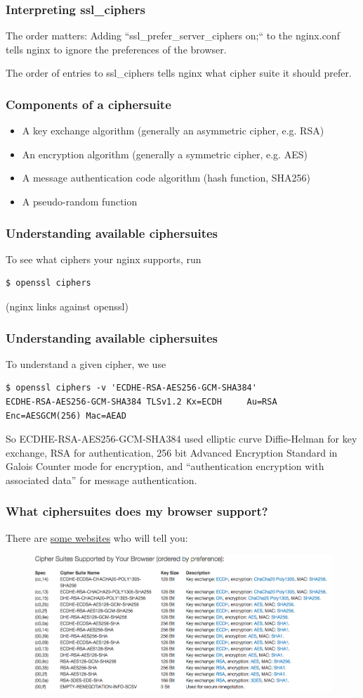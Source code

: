 \documentclass[9pt]{beamer}
\begin{document}
\begin{frame}
\frametitle{Interpreting ssl\_ciphers}
The order matters: Adding ``ssl\_prefer\_server\_ciphers on;`` to the nginx.conf tells nginx to ignore the preferences of the browser.

The order of entries to ssl\_ciphers tells nginx what cipher suite it should prefer.
\end{frame}

\begin{frame}[fragile]
\frametitle{Components of a ciphersuite}
\begin{itemize}
\item A key exchange algorithm (generally an asymmetric cipher, e.g. RSA)
\item An encryption algorithm (generally a symmetric cipher, e.g. AES)
\item A message authentication code algorithm  (hash function, SHA256)
\item A pseudo-random function
\end{itemize}
\end{frame}

\begin{frame}[fragile]
\frametitle{Understanding available ciphersuites}
To see what ciphers your nginx supports, run
\begin{verbatim}
$ openssl ciphers
\end{verbatim}
(nginx links against openssl)
\end{frame}

\begin{frame}[fragile]
\frametitle{Understanding available ciphersuites}
To understand a given cipher, we use
\begin{verbatim}
$ openssl ciphers -v 'ECDHE-RSA-AES256-GCM-SHA384'
ECDHE-RSA-AES256-GCM-SHA384 TLSv1.2 Kx=ECDH     Au=RSA  Enc=AESGCM(256) Mac=AEAD
\end{verbatim}
So ECDHE-RSA-AES256-GCM-SHA384 used elliptic curve Diffie-Helman for key exchange, RSA for authentication, 256 bit Advanced Encryption Standard in Galois Counter mode for encryption, and ``authentication encryption with associated data'' for message authentication.
\end{frame}

\begin{frame}
\frametitle{What ciphersuites does my browser support?}
There are \href{https://cc.dcsec.uni-hannover.de/}{some websites} who will tell you:
\begin{figure}
\includegraphics[scale=0.25]{figures/browserciphersuites.png}
\end{figure}
\end{frame}
\end{document}
